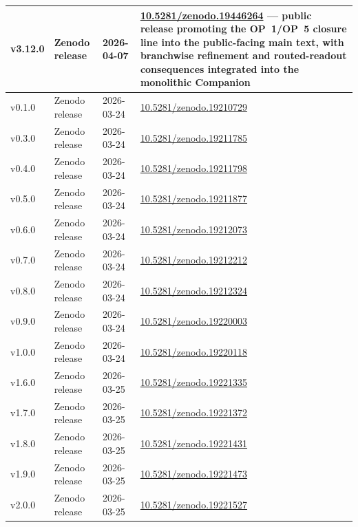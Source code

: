 {\begin{longtable}{|p{}|p{}|p{}|p{}|}
 v3.12.0 & Zenodo release & 2026-04-07 & \href{https://doi.org/10.5281/zenodo.19446264}{10.5281/zenodo.19446264} --- public release promoting the OP~1/OP~5 closure line into the public-facing main text, with branchwise refinement and routed-readout consequences integrated into the monolithic Companion \\
\hline
v0.1.0 & Zenodo release & 2026-03-24 & \href{https://doi.org/10.5281/zenodo.19210729}{10.5281/zenodo.19210729} \\
\hline
v0.3.0 & Zenodo release & 2026-03-24 & \href{https://doi.org/10.5281/zenodo.19211785}{10.5281/zenodo.19211785} \\
\hline
v0.4.0 & Zenodo release & 2026-03-24 & \href{https://doi.org/10.5281/zenodo.19211798}{10.5281/zenodo.19211798} \\
\hline
v0.5.0 & Zenodo release & 2026-03-24 & \href{https://doi.org/10.5281/zenodo.19211877}{10.5281/zenodo.19211877} \\
\hline
v0.6.0 & Zenodo release & 2026-03-24 & \href{https://doi.org/10.5281/zenodo.19212073}{10.5281/zenodo.19212073} \\
\hline
v0.7.0 & Zenodo release & 2026-03-24 & \href{https://doi.org/10.5281/zenodo.19212212}{10.5281/zenodo.19212212} \\
\hline
v0.8.0 & Zenodo release & 2026-03-24 & \href{https://doi.org/10.5281/zenodo.19212324}{10.5281/zenodo.19212324} \\
\hline
v0.9.0 & Zenodo release & 2026-03-24 & \href{https://doi.org/10.5281/zenodo.19220003}{10.5281/zenodo.19220003} \\
\hline
v1.0.0 & Zenodo release & 2026-03-24 & \href{https://doi.org/10.5281/zenodo.19220118}{10.5281/zenodo.19220118} \\
\hline
v1.6.0 & Zenodo release & 2026-03-25 & \href{https://doi.org/10.5281/zenodo.19221335}{10.5281/zenodo.19221335} \\
\hline
v1.7.0 & Zenodo release & 2026-03-25 & \href{https://doi.org/10.5281/zenodo.19221372}{10.5281/zenodo.19221372} \\
\hline
v1.8.0 & Zenodo release & 2026-03-25 & \href{https://doi.org/10.5281/zenodo.19221431}{10.5281/zenodo.19221431} \\
\hline
v1.9.0 & Zenodo release & 2026-03-25 & \href{https://doi.org/10.5281/zenodo.19221473}{10.5281/zenodo.19221473} \\
\hline
v2.0.0 & Zenodo release & 2026-03-25 & \href{https://doi.org/10.5281/zenodo.19221527}{10.5281/zenodo.19221527} \\

\end{longtable}}
